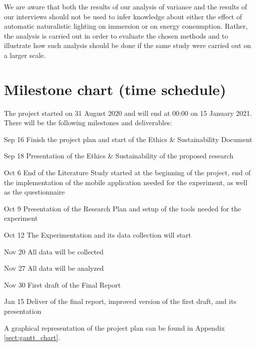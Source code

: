 \documentclass[12pt,twoside,english]{article}
\begin{document}
We are aware that both the results of our analysis of variance and the results of our interviews should not be used to infer knowledge about either the effect of automatic naturalistic lighting on immersion or on energy consumption.
Rather, the analysis is carried out in order to evaluate the chosen methods and to illustrate how such analysis should be done if the same study were carried out on a larger scale.

\section{Milestone chart (time schedule)}
\label{sect:milestones}

The project started on 31 August 2020 and will end at 00:00 on 15 January 2021. There will be the following milestones and deliverables:

\begin{description}
\item{Sep 16} Finish the project plan and start of the Ethics \& Sustainability Document

\item {Sep 18} Presentation of the Ethics \& Sustainability of the proposed research

\item {Oct 6} End of the Literature Study started at the beginning of the project, end of the implementation of the mobile application needed for the experiment, as well as the questionnaire

\item {Oct 9} Presentation of the Research Plan and setup of the tools needed for the experiment

\item {Oct 12} The Experimentation and its data collection will start

\item {Nov 20} All data will be collected

\item {Nov 27} All data will be analyzed

\item {Nov 30} First draft of the Final Report

\item {Jan 15} Deliver of the final report, improved version of the first draft, and its presentation

\end{description}

A graphical representation of the project plan can be found in Appendix \ref{sect:gantt_chart}.
\end{document}
